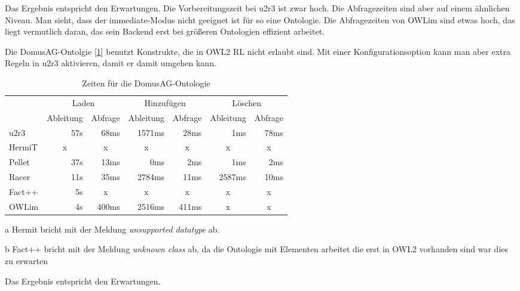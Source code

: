 Das Ergebnis entspricht den Erwartungen. Die Vorbereitungszeit bei u2r3 ist zwar hoch. Die Abfragezeiten sind aber auf einem ähnlichen Niveau.
Man sieht, dass der immediate-Modus nicht geeignet ist für so eine Ontologie. Die Abfragezeiten von OWLim sind etwas hoch, das liegt vermutlich daran, das sein Backend erst bei größeren Ontologien effizient arbeitet.

Die DomusAG-Ontolgie [\ref{table-time-domusag}] benutzt Konstrukte, die in OWL2 RL nicht erlaubt sind. Mit einer Konfigurationsoption kann man aber extra Regeln in u2r3 aktivieren, damit er damit umgehen kann.
\begin{table}[htbp]
\caption{Zeiten für die DomusAG-Ontologie}
\label{table-time-domusag}
\begin{center}
\begin{threeparttable}
\begin{tabular}{l|r|r|r|r|r|r|}
\cline{2-7}
 & \multicolumn{2}{|c|}{Laden} & \multicolumn{2}{|c|}{Hinzufügen} & \multicolumn{2}{|c|}{Löschen} \\
\cline{2-7}
 & \multicolumn{1}{|c|}{Ableitung} & \multicolumn{1}{|c|}{Abfrage} & \multicolumn{1}{|c|}{Ableitung} & \multicolumn{1}{|c|}{Abfrage} & \multicolumn{1}{|c|}{Ableitung} & \multicolumn{1}{|c|}{Abfrage} \\
\hline
\multicolumn{1}{|l|}{u2r3} & 57s & 68ms & 1571ms & 28ms & 1ms & 78ms \\ \hline
\multicolumn{1}{|l|}{HermiT\tnote{a}} & \multicolumn{1}{c|}{x} & \multicolumn{1}{c|}{x} & \multicolumn{1}{c|}{x} & \multicolumn{1}{c|}{x} & \multicolumn{1}{c|}{x} & \multicolumn{1}{c|}{x} \\ \hline
\multicolumn{1}{|l|}{Pellet} & 37s & 13ms & 0ms & 2ms & 1ms & 2ms \\ \hline
\multicolumn{1}{|l|}{Racer} & 11s & 35ms & 2784ms & 11ms & 2587ms & 10ms \\ \hline
\multicolumn{1}{|l|}{Fact++\tnote{b}} & 5s & \multicolumn{1}{c|}{x} & \multicolumn{1}{c|}{x} & \multicolumn{1}{c|}{x} & \multicolumn{1}{c|}{x} & \multicolumn{1}{c|}{x} \\ \hline
\multicolumn{1}{|l|}{OWLim} & 4s & 400ms & 2516ms & 411ms & \multicolumn{1}{c|}{x} & \multicolumn{1}{c|}{x} \\ \hline
\end{tabular}
\begin{tablenotes}
	\item[a] Hermit bricht mit der Meldung \emph{unsupported datatype} ab.
	\item[b] Fact++ bricht mit der Meldung \emph{unknown class} ab, da die Ontologie mit Elementen arbeitet die erst in OWL2 vorhanden sind war dies zu erwarten
\end{tablenotes}
\end{threeparttable}
\end{center}
\end{table}
Das Ergebnis entspricht den Erwartungen.

